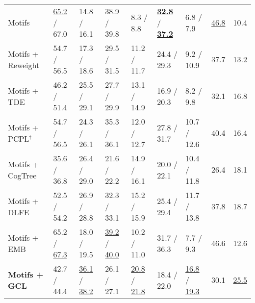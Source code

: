 \documentclass[10pt,twocolumn,letterpaper]{article}
\begin{document}
\begin{table*}[t]
\begin{tabular}{p{3.2cm}|p{1.4cm}<{\centering}p{1.4cm}<{\centering}|p{1.4cm}<{\centering}p{1.4cm}<{\centering}|p{1.4cm}<{\centering}p{1.4cm}<{\centering}|p{0.5cm}<{\centering}p{0.5cm}}
		Motifs \cite{tang2020unbiased} &  \underline{65.2} / 67.0 & 14.8 / 16.1 & 38.9 / 39.8 & 8.3 / 8.8 & \underline{\textbf{32.8}} / \underline{\textbf{37.2}} & 6.8 / 7.9 & \underline{46.8} & 10.4 \\
		Motifs + Reweight \cite{chiou2021recovering} &  54.7 / 56.5 & 17.3 / 18.6 & 29.5 / 31.5 & 11.2 / 11.7 & 24.4 / 29.3 & 9.2 / 10.9 & 37.7 & 13.2 \\
		Motifs + TDE \cite{tang2020unbiased} & 46.2 / 51.4 & 25.5 / 29.1 & 27.7 / 29.9 & 13.1 / 14.9 & 16.9 / 20.3 & 8.2 / 9.8 & 32.1 & 16.8 \\
		Motifs + {PCPL}$^{\dag}$ \cite{chiou2021recovering}  & 54.7 / 56.5 & 24.3 / 26.1 & 35.3 / 36.1 & 12.0 / 12.7 & 27.8 / 31.7 & 10.7 / 12.6 & 40.4 & 16.4 \\
		Motifs + CogTree \cite{yu2020cogtree} & 35.6 / 36.8 & 26.4 / 29.0 & 21.6 / 22.2 & 14.9 / 16.1 & 20.0 / 22.1 & 10.4 / 11.8 & 26.4 & 18.1 \\
		Motifs + DLFE \cite{chiou2021recovering} & 52.5 / 54.2 & 26.9 / 28.8 & 32.3 / 33.1 & 15.2 / 15.9 & 25.4 / 29.4 & 11.7 / 13.8 & 37.8 & 18.7 \\
		Motifs + EMB \cite{suhail2021energy} & 65.2 / \underline{67.3} & 18.0 / 19.5 & \underline{39.2} / \underline{40.0} & 10.2 / 11.0 & 31.7 / 36.3 & 7.7 / 9.3 & 46.6 & 12.6 \\
		\textbf{Motifs + GCL} & 42.7 / 44.4 & \underline{36.1} / \underline{38.2} & 26.1 / 27.1 & \underline{20.8} / \underline{21.8} & 18.4 / 22.0 & \underline{16.8} / \underline{19.3} & 30.1 & \underline{25.5} \\\hline
		

\end{tabular}
\end{table*}
\end{document}
